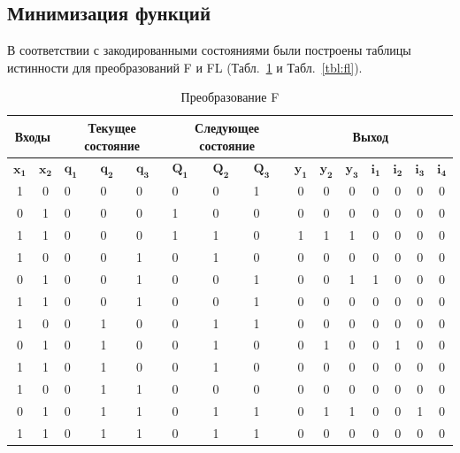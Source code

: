 \documentclass[a4paper, final]{article}
\begin{document}
\subsection{Минимизация функций}
В соответствии с закодированными состояниями были построены таблицы истинности для преобразований F и FL (Табл.~\ref{tbl:f} и Табл.~\ref{tbl:fl}).

\begin{table}[h!]
  \centering
  \caption{Преобразование F}
  \label{tbl:f}
  \scriptsize

  \begin{tabularx}{\textwidth}{|c|c|X|X|X||X|X|X|c|c|c||c|c|c|c|}
  \hline
  \multicolumn{2}{|c}{\textbf{Входы}} & \multicolumn{3}{|c||}{\textbf{Текущее состояние}} & \multicolumn{3}{c|}{\textbf{Следующее состояние}} & \multicolumn{7}{c|}{\textbf{Выход}} \\
  \hline
  $\mathbf{x_1}$& $\mathbf{x_2}$ & $\mathbf{q_1}$ & $\mathbf{q_2}$ & $\mathbf{q_3}$ & $\mathbf{Q_1}$ & $\mathbf{Q_2}$ & $\mathbf{Q_3}$ & $\mathbf{y_1}$ & $\mathbf{y_2}$ & $\mathbf{y_3}$ & $\mathbf{i_1}$ & $\mathbf{i_2}$ & $\mathbf{i_3}$ & $\mathbf{i_4}$ \\
  \hline
  \hline
  1 & 0 &   0 & 0 & 0 &  0 & 0 & 1 &  0 & 0 & 0 &  0 & 0 & 0 & 0\\
  \hline
  0 & 1 &   0 & 0 & 0 &  1 & 0 & 0 &  0 & 0 & 0 &  0 & 0 & 0 & 0\\
  \hline
  1 & 1 &   0 & 0 & 0 &  1 & 1 & 0 &  1 & 1 & 1 &  0 & 0 & 0 & 0\\
  \hline

  1 & 0 &   0 & 0 & 1 &  0 & 1 & 0 &  0 & 0 & 0 &  0 & 0 & 0 & 0\\
  \hline
  0 & 1 &   0 & 0 & 1 &  0 & 0 & 1 &  0 & 0 & 1 &  1 & 0 & 0 & 0\\
  \hline
  1 & 1 &   0 & 0 & 1 &  0 & 0 & 1 &  0 & 0 & 0 &  0 & 0 & 0 & 0\\

  \hline
  1 & 0 &   0 & 1 & 0 &  0 & 1 & 1 &  0 & 0 & 0 &  0 & 0 & 0 & 0\\
  \hline
  0 & 1 &   0 & 1 & 0 &  0 & 1 & 0 &  0 & 1 & 0 &  0 & 1 & 0 & 0\\
  \hline
  1 & 1 &   0 & 1 & 0 &  0 & 1 & 0 &  0 & 0 & 0 &  0 & 0 & 0 & 0\\
  \hline
  
  1 & 0 &   0 & 1 & 1 &  0 & 0 & 0 &  0 & 0 & 0 &  0 & 0 & 0 & 0\\
  \hline
  0 & 1 &   0 & 1 & 1 &  0 & 1 & 1 &  0 & 1 & 1 &  0 & 0 & 1 & 0\\
  \hline
  1 & 1 &   0 & 1 & 1 &  0 & 1 & 1 &  0 & 0 & 0 &  0 & 0 & 0 & 0\\
  \hline


\end{tabularx}
\end{table}
\end{document}

